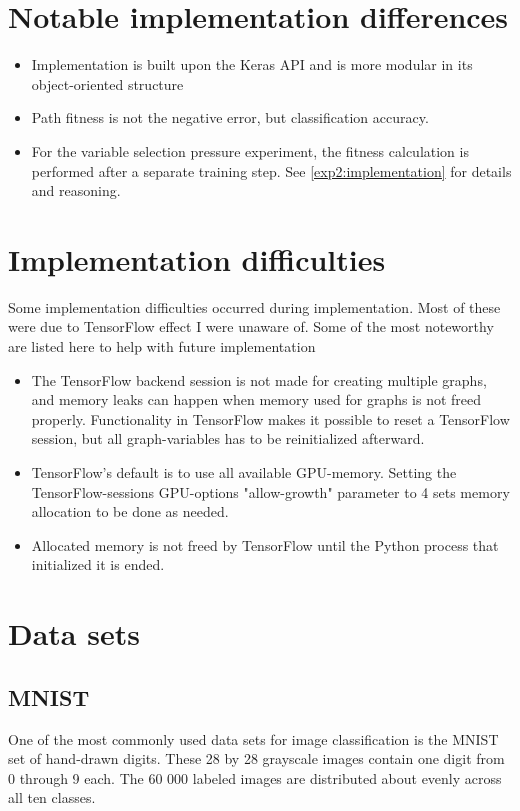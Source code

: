\section{Notable implementation differences}
\begin{itemize}
    \item Implementation is built upon the Keras API and is more modular in its object-oriented structure
    \item Path fitness is not the negative error, but classification accuracy. 
    \item For the variable selection pressure experiment, the fitness calculation is performed after a separate training step. See \ref{exp2:implementation} for details and reasoning.
\end{itemize}

\section{Implementation difficulties} 
\label{implementation:problems}
Some implementation difficulties occurred during implementation. Most of these were due to TensorFlow effect I were unaware of. Some of the most noteworthy are listed here to help with future implementation
\begin{itemize}
    \item The TensorFlow backend session is not made for creating multiple graphs, and memory leaks can happen when memory used for graphs is not freed properly. Functionality in TensorFlow makes it possible to reset a TensorFlow session, but all graph-variables has to be reinitialized afterward. 
    \item TensorFlow's default is to use all available GPU-memory. Setting the TensorFlow-sessions GPU-options "allow-growth" parameter to 4 sets memory allocation to be done as needed.
    \item Allocated memory is not freed by TensorFlow until the Python process that initialized it is ended.
\end{itemize}

\section{Data sets}
\subsection{MNIST}\label{Implementation:MNIST}
One of the most commonly used data sets for image classification is the MNIST\cite{MNIST} set of hand-drawn digits. These 28 by 28 grayscale images contain one digit from 0 through 9 each. The 60 000  labeled images are distributed about evenly across all ten classes. 

